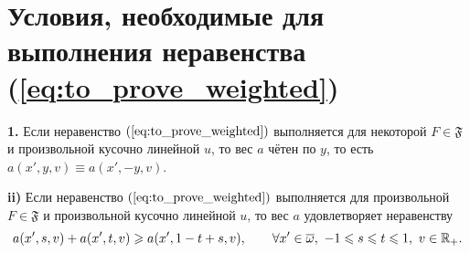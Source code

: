 \section{Условия, необходимые для выполнения неравенства (\ref{eq:to_prove_weighted})}


\begin{thm}
\label{thm:necessary_conditions_weighted}
\textbf{1.}
Если неравенство $(\ref{eq:to_prove_weighted})$ выполняется для некоторой $F \in \mathfrak{F}$ и произвольной кусочно линейной $u$,
то вес $a$ чётен по $y$, то есть $a(x', y, v) \equiv a(x', -y, v)$.

\textbf{\textup{ii)}}
Если неравенство $(\ref{eq:to_prove_weighted})$ выполняется для произвольной $F \in \mathfrak{F}$
и произвольной кусочно линейной $u$, то вес $a$ удовлетворяет неравенству
\begin{equation}
\label{eq:almostConcave}
a(x', s, v) + a(x', t, v) \ge a(x', 1 - t + s, v), \qquad \forall x' \in \overline{\omega},\ -1 \le s \le t \le 1,\ v \in \Real_+.
\end{equation}
\end{thm}

